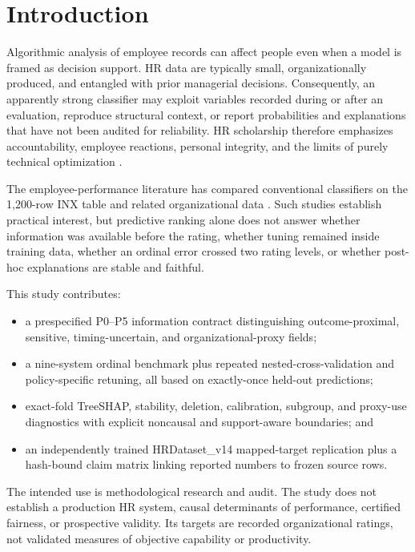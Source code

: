 \documentclass[information,article,submit,pdftex,moreauthors]{Definitions/mdpi}
\begin{document}
\section{Introduction}

Algorithmic analysis of employee records can affect people even when a model is framed as decision support. HR data are typically small, organizationally produced, and entangled with prior managerial decisions. Consequently, an apparently strong classifier may exploit variables recorded during or after an evaluation, reproduce structural context, or report probabilities and explanations that have not been audited for reliability. HR scholarship therefore emphasizes accountability, employee reactions, personal integrity, and the limits of purely technical optimization \cite{tambe2019artificial,leichtdeobald2019challenges,kochling2020discriminated,giermindl2021dark}.

The employee-performance literature has compared conventional classifiers on the 1,200-row INX table and related organizational data \cite{archana2019application,lather2019prediction,li2021employee,patel2022ranker,adeniyi2022comparison,nayem2024unbiased,putri2026klasifikasi}. Such studies establish practical interest, but predictive ranking alone does not answer whether information was available before the rating, whether tuning remained inside training data, whether an ordinal error crossed two rating levels, or whether post-hoc explanations are stable and faithful.

This study contributes:

\begin{itemize}
\item a prespecified P0–P5 information contract distinguishing outcome-proximal, sensitive, timing-uncertain, and organizational-proxy fields;
\item a nine-system ordinal benchmark plus repeated nested-cross-validation and policy-specific retuning, all based on exactly-once held-out predictions;
\item exact-fold TreeSHAP, stability, deletion, calibration, subgroup, and proxy-use diagnostics with explicit noncausal and support-aware boundaries; and
\item an independently trained HRDataset\_v14 mapped-target replication plus a hash-bound claim matrix linking reported numbers to frozen source rows.
\end{itemize}

The intended use is methodological research and audit. The study does not establish a production HR system, causal determinants of performance, certified fairness, or prospective validity. Its targets are recorded organizational ratings, not validated measures of objective capability or productivity.
\end{document}
